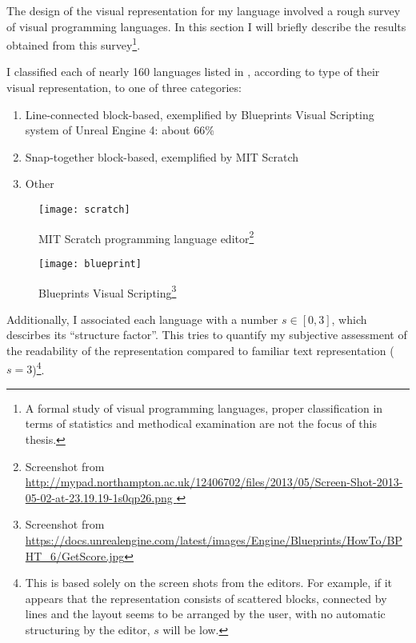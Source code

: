 The design of the visual representation for my language involved a rough survey
of visual programming languages. In this section I will briefly describe the
results obtained from this survey\footnote{A formal study of visual programming
  languages, proper classification in terms of statistics and methodical
  examination are not the focus of this thesis. }.

I classified each of nearly 160 languages listed in \cite{snapshots}, according
to type of their visual representation, to one of three categories:
\begin{enumerate}
    \item Line-connected block-based, exemplified by Blueprints Visual
    Scripting system of Unreal Engine 4\cite{blueprint}: about 66\%
    \item Snap-together block-based, exemplified by MIT Scratch\cite{scratch, scratch_wikipedia}
    \item Other
\end{enumerate}


\begin{figure}[h!]
\centering \texttt{[image: scratch]}
\caption{ MIT Scratch programming language editor\protect\footnote{ Screenshot
        from \url{
            http://mypad.northampton.ac.uk/12406702/files/2013/05/Screen-Shot-2013-05-02-at-23.19.19-1s0qp26.png
        } } }
\label{fig:scratch}
\end{figure}

\begin{figure}[h!]
\centering \texttt{[image: blueprint]}
\caption{Blueprints Visual Scripting\protect\footnote{Screenshot from
        \url{https://docs.unrealengine.com/latest/images/Engine/Blueprints/HowTo/BPHT_6/GetScore.jpg}}}
\label{fig:blueprint}
\end{figure}


Additionally, I associated each language with a number $s \in [0, 3]$, which
descirbes its ``structure factor''. This tries to quantify my subjective
assessment of the readability of the representation compared to familiar text
representation ($s = 3$)\footnote{This is based solely on the screen shots from
  the editors. For example, if it appears that the representation consists of
  scattered blocks, connected by lines and the layout seems to be arranged by
  the user, with no automatic structuring by the editor, $s$ will be low.}.

